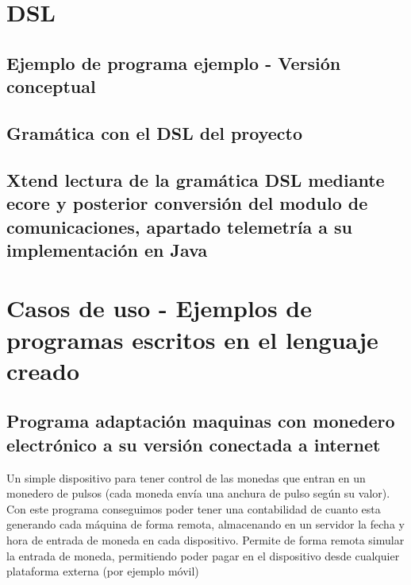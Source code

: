 \chapter{DSL}

\section{Ejemplo de programa ejemplo - Versión conceptual}
\label{appendix:dsl_motivacion_ejemplo}


\section{Gramática con el DSL del proyecto}
\label{appendix:dsl_final}


\section{Xtend lectura de la gramática DSL mediante ecore y posterior conversión del modulo de comunicaciones, apartado telemetría a su implementación en Java}
\label{appendix:xtend_telemetry}





\chapter{Casos de uso - Ejemplos de programas escritos en el lenguaje creado}

\section{Programa adaptación maquinas con monedero electrónico a su versión conectada a internet}
\label{appendix:ejemplo_dsl_monedero}

Un simple dispositivo para tener control de las monedas que entran en un 
monedero de pulsos (cada moneda envía una anchura de pulso según su valor).
Con este programa conseguimos poder tener una contabilidad de cuanto esta generando cada máquina
de forma remota, almacenando en un servidor la fecha y hora de entrada de moneda en cada 
dispositivo.
Permite de forma remota simular la entrada de moneda, permitiendo poder pagar en el dispositivo
desde cualquier plataforma externa (por ejemplo móvil)





